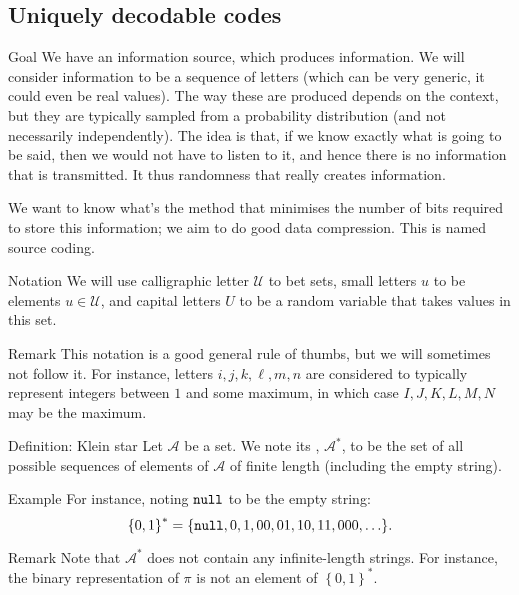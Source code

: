 \documentclass[a4paper]{article}
\begin{document}
\subsection{Uniquely decodable codes}

\begin{parag}{Goal}
    We have an information source, which produces information. We will consider information to be a sequence of letters (which can be very generic, it could even be real values). The way these are produced depends on the context, but they are typically sampled from a probability distribution (and not necessarily independently). The idea is that, if we know exactly what is going to be said, then we would not have to listen to it, and hence there is no information that is transmitted. It thus randomness that really creates information.

    We want to know what's the method that minimises the number of bits required to store this information; we aim to do good data compression. This is named source coding.
\end{parag}

\begin{parag}{Notation}
    We will use calligraphic letter $\mathcal{U}$ to bet sets, small letters $u$ to be elements $u \in \mathcal{U}$, and capital letters $U$ to be a random variable that takes values in this set.

    \begin{subparag}{Remark}
        This notation is a good general rule of thumbs, but we will sometimes not follow it. For instance, letters $i, j, k, \ell, m, n$ are considered to typically represent integers between $1$ and some maximum, in which case $I, J, K, L, M, N$ may be the maximum.
    \end{subparag}
\end{parag}

\begin{parag}{Definition: Klein star}
    Let $\mathcal{A}$ be a set. We note its , $\mathcal{A}^*$, to be the set of all possible sequences of elements of $\mathcal{A}$ of finite length (including the empty string).

    \begin{subparag}{Example}
        For instance, noting $\texttt{null}$ to be the empty string: 
        \[\left\{0, 1\right\}^* = \left\{\emptystring, 0, 1, 00, 01, 10, 11, 000, \ldots\right\}.\]
    \end{subparag}

    \begin{subparag}{Remark}
        Note that $\mathcal{A}^*$ does not contain any infinite-length strings. For instance, the binary representation of $\pi$ is not an element of $\left\{0, 1\right\}^*$.
    \end{subparag}
\end{parag}
\end{document}

